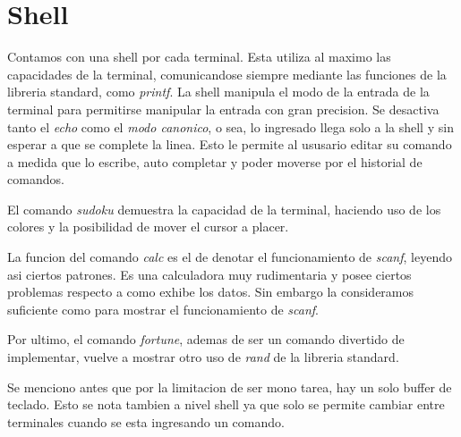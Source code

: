 \documentclass[a4paper,10pt]{article}
\begin{document}
\section{Shell}
    Contamos con una shell por cada terminal.
    Esta utiliza al maximo las capacidades de la terminal, comunicandose siempre mediante las funciones de la libreria standard, como \textit{printf}.
    La shell manipula el modo de la entrada de la terminal para permitirse manipular la entrada con gran precision.
    Se desactiva tanto el \textit{echo} como el \textit{modo canonico}, o sea, lo ingresado llega solo a la shell y sin esperar a que se complete la linea.
    Esto le permite al ususario editar su comando a medida que lo escribe, auto completar y poder moverse por el historial de comandos.

    El comando \textit{sudoku} demuestra la capacidad de la terminal, haciendo uso de los colores y la posibilidad de mover el cursor a placer.
    
    La funcion del comando \textit{calc} es el de denotar el funcionamiento de \textit{scanf}, leyendo asi ciertos patrones.
    Es una calculadora muy rudimentaria y posee ciertos problemas respecto a como exhibe los datos.
    Sin embargo la consideramos suficiente como para mostrar el funcionamiento de \textit{scanf}.
    
    Por ultimo, el comando \textit{fortune}, ademas de ser un comando divertido de implementar, vuelve a mostrar otro uso de \textit{rand} de la libreria standard.

    Se menciono antes que por la limitacion de ser mono tarea, hay un solo buffer de teclado.
    Esto se nota tambien a nivel shell ya que solo se permite cambiar entre terminales cuando se esta ingresando un comando.
\end{document}
